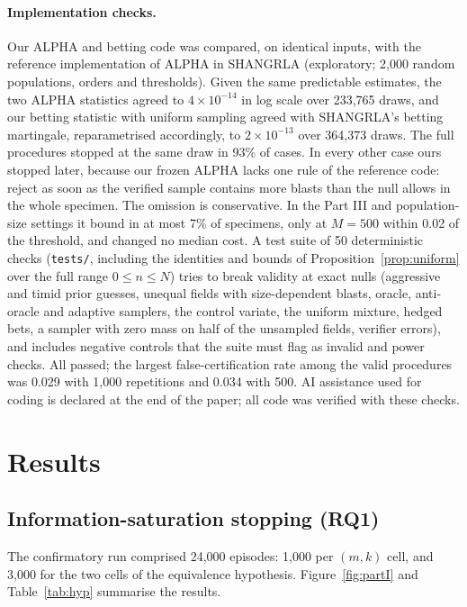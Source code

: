 \documentclass[11pt]{article}
\theoremstyle{remark}
\theoremstyle{definition}
\begin{document}
\paragraph{Implementation checks.} Our ALPHA and betting code was compared, on identical inputs, with the reference implementation of ALPHA in SHANGRLA \cite{stark2023alpha} (exploratory; 2,000 random populations, orders and thresholds). Given the same predictable estimates, the two ALPHA statistics agreed to $4\times10^{-14}$ in log scale over 233,765 draws, and our betting statistic with uniform sampling agreed with SHANGRLA's betting martingale, reparametrised accordingly, to $2\times10^{-13}$ over 364,373 draws. The full procedures stopped at the same draw in 93\% of cases. In every other case ours stopped later, because our frozen ALPHA lacks one rule of the reference code: reject as soon as the verified sample contains more blasts than the null allows in the whole specimen. The omission is conservative. In the Part III and population-size settings it bound in at most 7\% of specimens, only at $M=500$ within 0.02 of the threshold, and changed no median cost. A test suite of 50 deterministic checks (\texttt{tests/}, including the identities and bounds of Proposition~\ref{prop:uniform} over the full range $0\le n\le N$) tries to break validity at exact nulls (aggressive and timid prior guesses, unequal fields with size-dependent blasts, oracle, anti-oracle and adaptive samplers, the control variate, the uniform mixture, hedged bets, a sampler with zero mass on half of the unsampled fields, verifier errors), and includes negative controls that the suite must flag as invalid and power checks. All passed; the largest false-certification rate among the valid procedures was 0.029 with 1,000 repetitions and 0.034 with 500. AI assistance used for coding is declared at the end of the paper; all code was verified with these checks.

\section{Results}
\subsection{Information-saturation stopping (RQ1)}\label{sec:partI}
The confirmatory run comprised 24,000 episodes: 1,000 per $(m,k)$ cell, and 3,000 for the two cells of the equivalence hypothesis. Figure~\ref{fig:partI} and Table~\ref{tab:hyp} summarise the results.
\end{document}
